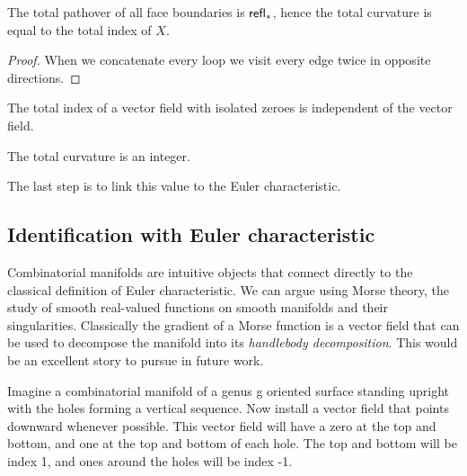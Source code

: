 \begin{mythm}
The total pathover of all face boundaries is \( \mathsf{refl}_* \), hence the total curvature is equal to the total index of \( X \).
\end{mythm}
\begin{proof}
When we concatenate every loop we visit every edge twice in opposite directions.
\end{proof}

\begin{mycor}
The total index of a vector field with isolated zeroes is independent of the vector field.
\end{mycor}

\begin{mycor}
The total curvature is an integer.
\end{mycor}

The last step is to link this value to the Euler characteristic.

\subsection{Identification with Euler characteristic}

Combinatorial manifolds are intuitive objects that connect directly to the classical definition of Euler characteristic. We can argue using Morse theory, the study of smooth real-valued functions on smooth manifolds and their singularities. Classically the gradient of a Morse function is a vector field that can be used to decompose the manifold into its \emph{handlebody decomposition}. This would be an excellent story to pursue in future work.

Imagine a combinatorial manifold of a genus g oriented surface standing upright with the holes forming a vertical sequence. Now install a vector field that points downward whenever possible. This vector field will have a zero at the top and bottom, and one at the top and bottom of each hole. The top and bottom will be index 1, and ones around the holes will be index -1. 


